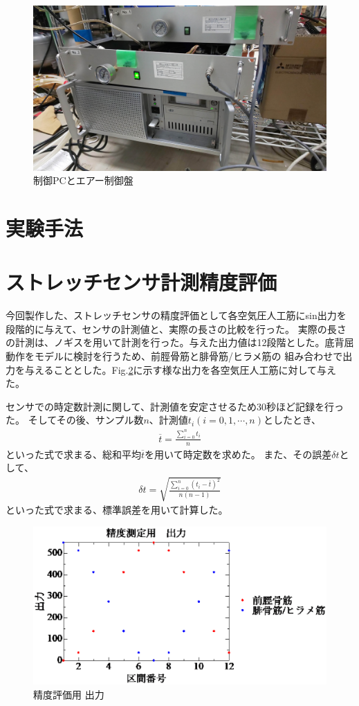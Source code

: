 \begin{figure}[h]
    \begin{center}
     \includegraphics[width=0.65\columnwidth,clip]{./3_analysis/PC.eps}
     \caption{制御PCとエアー制御盤}
     \label{fig:PC}
    \end{center}
\end{figure}

\newpage

\section{実験手法}
\section{ストレッチセンサ計測精度評価}
今回製作した、ストレッチセンサの精度評価として各空気圧人工筋にsin出力を段階的に与えて、センサの計測値と、実際の長さの比較を行った。
実際の長さの計測は、ノギスを用いて計測を行った。与えた出力値は12段階とした。底背屈動作をモデルに検討を行うため、前脛骨筋と腓骨筋/ヒラメ筋の
組み合わせで出力を与えることとした。Fig.\ref{output_for_test}に示す様な出力を各空気圧人工筋に対して与えた。

センサでの時定数計測に関して、計測値を安定させるため30秒ほど記録を行った。
そしてその後、サンプル数$n$、計測値$t_i \left(i=0,1,\cdots,n\right)$としたとき、
\begin{eqnarray}
        \overline{t}=\frac{\sum_{i=0}^n t_i}{n}
\end{eqnarray}
といった式で求まる、総和平均$\overline{t}$を用いて時定数を求めた。
また、その誤差$\delta t$として、
\begin{eqnarray}
    \delta t = \sqrt{ \frac{\sum_{i=0}^n \left(t_i-\overline{t}\right)^2}{n(n-1)}}
\end{eqnarray}
といった式で求まる、標準誤差を用いて計算した。

\begin{figure}[h]
    \begin{center}
        \includegraphics[width=0.78\columnwidth,clip]{2_measurement/output/output.eps}
        \caption{精度評価用 出力}
        \label{output_for_test}
    \end{center}
\end{figure}